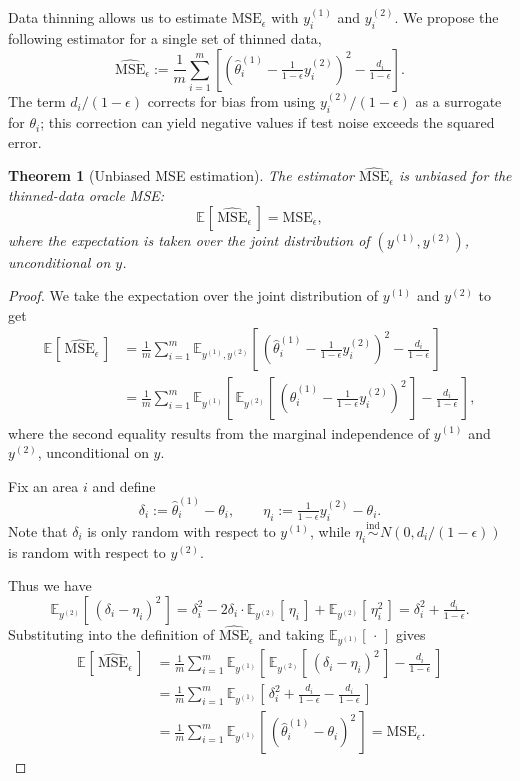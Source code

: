 \documentclass[11pt]{article}
\newcommand{\ind}{\stackrel{\text{ind}}{\sim}}
\newcommand{\thetatrain}{\hat{\theta}^{(1)}}           %
\newcommand{\ytrain}{y^{(1)}}                           %
\newcommand{\ytest}{y^{(2)}}                            %
\newcommand{\msehat}{\widehat{\mathrm{MSE}}_{\epsilon}}
\newcommand{\msethin}{\mathrm{MSE}_{\epsilon}}
\newcommand{\E}[2][]{\mathbb{E}_{#1}\!\left[\,#2\,\right]}
\theoremstyle{plain}
\newtheorem{theorem}{Theorem}[section]   %
\theoremstyle{definition}
\theoremstyle{remark}
\begin{document}
Data thinning allows us to estimate $\msethin$ with $\ytrain_i$ and $\ytest_i$. We propose the following estimator for a single set of thinned data,
\[
\msehat := \frac{1}{m}\sum_{i=1}^m \left[ \left( \thetatrain_i - \tfrac{1}{1-\epsilon}\ytest_i \right)^{\!2} - \tfrac{d_i}{1-\epsilon} \right].
\]
The term $d_i/(1-\epsilon)$ corrects for bias from using $\ytest_i /(1-\epsilon)$ as a surrogate for $\theta_i$; this correction can yield negative values if test noise exceeds the squared error.
\begin{theorem}[Unbiased MSE estimation]
\label{thm:unbiased_mse}
The estimator $\msehat$ is unbiased for the thinned-data oracle MSE:
\[
\E{\msehat} = \msethin,
\]
where the expectation is taken over the joint distribution of $(y^{(1)}, y^{(2)})$, unconditional on $y$.
\end{theorem}

\begin{proof}
We take the expectation over the joint distribution of $\ytrain$ and $\ytest$ to get
\begin{align*}
    \E{\msehat}
& = \frac{1}{m}\sum_{i=1}^m
   \E[\ytrain, \ytest]{ \left( \thetatrain_i - \tfrac{1}{1-\epsilon}\ytest_i \right)^{\!2}
         - \tfrac{d_i}{1-\epsilon}} \\
&=  \frac{1}{m}\sum_{i=1}^m\E[\ytrain]{\E[\ytest]{\left( \thetatrain_i - \tfrac{1}{1-\epsilon}\ytest_i \right)^{\!2}} - \tfrac{d_i}{1-\epsilon}},
\end{align*}
where the second equality results from the marginal independence of $\ytrain$ and $\ytest$, unconditional on $y$.

Fix an area $i$ and define
\[
\delta_i := \thetatrain_i - \theta_i,
\qquad
\eta_i := \tfrac{1}{1-\epsilon}\ytest_i - \theta_i .
\]
Note that $\delta_i$ is only random with respect to $\ytrain$, while $\eta_i \ind N(0, d_i/(1-\epsilon))$ is random with respect to $\ytest$.

Thus we have
\[
\E[\ytest]{(\delta_i-\eta_i)^2}
=
\delta_i^2 - 2 \delta_i \cdot \E[\ytest]{\eta_i} +  \E[\ytest]{\eta_i^2}
=
\delta_i^2 + \tfrac{d_i}{1-\epsilon}.
\]
Substituting into the definition of $\msehat$ and taking $\E[\ytrain]{\cdot}$ gives
\begin{align*}
    \E{\msehat}
&=  \frac{1}{m}\sum_{i=1}^m\E[\ytrain]{\E[\ytest]{(\delta_i-\eta_i)^2} - \tfrac{d_i}{1-\epsilon}}\\
&=  \frac{1}{m}\sum_{i=1}^m \E[\ytrain]{\delta_i^2 + \tfrac{d_i}{1-\epsilon} - \tfrac{d_i}{1-\epsilon}}  \\
&=
\frac{1}{m}\sum_{i=1}^m \E[\ytrain]{\left( \thetatrain_i - \theta_i \right)^2}
=
\msethin.
\end{align*}
\end{proof}
\end{document}
